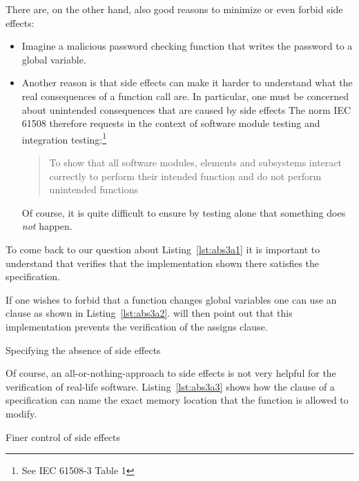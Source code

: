 \clearpage

There are, on the other hand, also good reasons to minimize or even forbid side 
effects:

\begin{itemize}
\item
Imagine a malicious password checking function that writes the password to
a global variable.

\item
Another reason is that side effects can make it harder to understand what 
the real consequences of a function call are.
In particular, one must be concerned about unintended consequences that
are caused by side effects
The norm IEC 61508 therefore requests in the context of software module testing
and integration testing:\footnote{%
   See IEC 61508-3 Table 1
}

\begin{quote}
To show that all software modules,
elements and subsystems interact correctly
to perform their intended function and do not perform unintended functions
\end{quote}

Of course, it is quite difficult to ensure by testing alone that something does \emph{not} happen.
\end{itemize}

To come back to our question about Listing~\ref{lst:abs3a1} it is important
to understand that \framacwp verifies that the implementation shown there
satisfies the specification.

If one wishes to forbid that a function changes global variables
one can use an  clause as shown in Listing~\ref{lst:abs3a2}.
\framacwp will then point out that this implementation prevents
the verification of the assigns clause.

\begin{listing}[hbt]
\begin{minipage}{\textwidth}

\end{minipage}
\caption{\label{lst:abs3a2} Specifying the absence of side effects}
\end{listing}


\clearpage

Of course, an all-or-nothing-approach to side effects is not very helpful
for the verification of real-life software.
Listing~\ref{lst:abs3a3} shows how the  clause of a
specification can name the exact memory location that the
function is allowed to modify.

\begin{listing}[hbt]
\begin{minipage}{\textwidth}

\end{minipage}
\caption{\label{lst:abs3a3} Finer control of side effects}
\end{listing}


